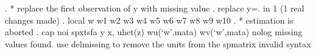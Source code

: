 . * replace the first observation of y with missing value
. replace y=. in 1
(1 real changes made)
{\smallskip}
. local w w1 w2 w3 w4 w5 w6 w7 w8 w9 w10
{\smallskip}
. * estimation is aborted
. cap noi spxtsfa y x, uhet(z) wu(`w',mata) wv(`w',mata)  nolog
missing values found. use delmissing to remove the units from the spmatrix
invalid syntax
{\smallskip}
